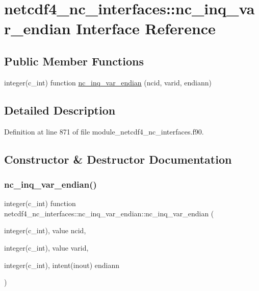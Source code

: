 \hypertarget{interfacenetcdf4__nc__interfaces_1_1nc__inq__var__endian}{}\section{netcdf4\+\_\+nc\+\_\+interfaces\+:\+:nc\+\_\+inq\+\_\+var\+\_\+endian Interface Reference}
\label{interfacenetcdf4__nc__interfaces_1_1nc__inq__var__endian}
\subsection*{Public Member Functions}
\begin{DoxyCompactItemize}
\item 
integer(c\+\_\+int) function \hyperlink{interfacenetcdf4__nc__interfaces_1_1nc__inq__var__endian_a9e2367b22f2ccbe8f2fd45dc4440f88c}{nc\+\_\+inq\+\_\+var\+\_\+endian} (ncid, varid, endiann)
\end{DoxyCompactItemize}


\subsection{Detailed Description}


Definition at line 871 of file module\+\_\+netcdf4\+\_\+nc\+\_\+interfaces.\+f90.



\subsection{Constructor \& Destructor Documentation}
\mbox{\label{interfacenetcdf4__nc__interfaces_1_1nc__inq__var__endian_a9e2367b22f2ccbe8f2fd45dc4440f88c}} 
\subsubsection{\texorpdfstring{nc\+\_\+inq\+\_\+var\+\_\+endian()}{nc\_inq\_var\_endian()}}
{\footnotesize\ttfamily integer(c\+\_\+int) function netcdf4\+\_\+nc\+\_\+interfaces\+::nc\+\_\+inq\+\_\+var\+\_\+endian\+::nc\+\_\+inq\+\_\+var\+\_\+endian (\begin{DoxyParamCaption}\item[{integer(c\+\_\+int), value}]{ncid,  }\item[{integer(c\+\_\+int), value}]{varid,  }\item[{integer(c\+\_\+int), intent(inout)}]{endiann }\end{DoxyParamCaption})}



